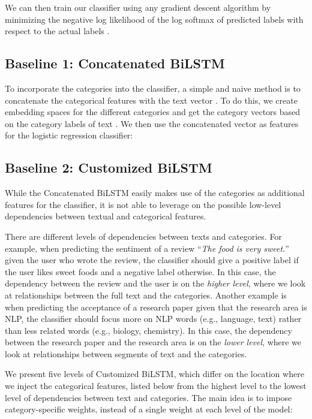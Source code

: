 \documentclass[11pt,a4paper]{article}
\begin{document}
We can then train our classifier using any gradient descent algorithm by minimizing the negative log likelihood of the log softmax of predicted labels  with respect to the actual labels .

\subsection{Baseline 1: Concatenated \mbox{BiLSTM}}

To incorporate the categories into the classifier, a simple and naive method is to concatenate the categorical features with the text vector . To do this, we create embedding spaces for the different categories and get the category vectors  based on the category labels of text . We then use the concatenated vector as features for the logistic regression classifier:


\subsection{Baseline 2: Customized \mbox{BiLSTM}}

While the Concatenated \mbox{BiLSTM} easily makes use of the categories as additional features for the classifier, it is not able to leverage on the possible low-level dependencies between textual and categorical features.

There are different levels of dependencies between texts and categories. For example, when predicting the sentiment of a review ``\textit{The food is very sweet.}'' given the user who wrote the review, the classifier should give a positive label if the user likes sweet foods and a negative label otherwise. In this case, the dependency between the review and the user is on the \textit{higher level}, where we look at relationships between the full text and the categories. Another example is when predicting the acceptance of a research paper given that the research area is NLP, the classifier should focus more on NLP words (e.g., language, text) rather than less related words (e.g., biology, chemistry). In this case, the dependency between the research paper and the research area is on the \textit{lower level}, where we look at relationships between segments of text and the categories.

We present five levels of Customized \mbox{BiLSTM}, which differ on the location where we inject the categorical features, listed below from the highest level to the lowest level of dependencies between text and categories. The main idea is to impose category-specific weights, instead of a single weight at each level of the model:
\end{document}
